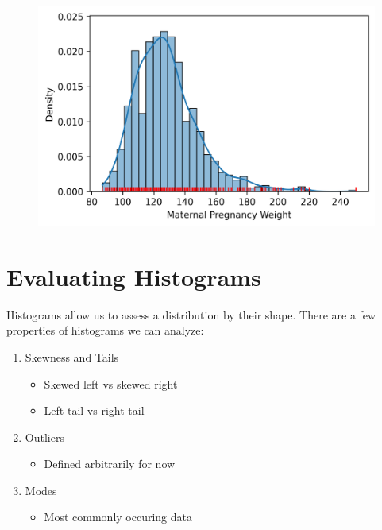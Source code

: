\documentclass[
  letterpaper,
  DIV=11,
  numbers=noendperiod]{scrreprt}
\providecommand{\tightlist}{%
  \setlength{\itemsep}{0pt}\setlength{\parskip}{0pt}}\usepackage{longtable,booktabs,array}
\begin{document}
\begin{figure}[H]

{\centering \includegraphics{visualization_1/visualization_1_files/figure-pdf/cell-10-output-1.png}

}

\end{figure}

\hypertarget{evaluating-histograms}{%
\section{Evaluating Histograms}\label{evaluating-histograms}}

Histograms allow us to assess a distribution by their shape. There are a
few properties of histograms we can analyze:

\begin{enumerate}
\def\labelenumi{\arabic{enumi}.}
\tightlist
\item
  Skewness and Tails

  \begin{itemize}
  \tightlist
  \item
    Skewed left vs skewed right
  \item
    Left tail vs right tail
  \end{itemize}
\item
  Outliers

  \begin{itemize}
  \tightlist
  \item
    Defined arbitrarily for now
  \end{itemize}
\item
  Modes

  \begin{itemize}
  \tightlist
  \item
    Most commonly occuring data
  \end{itemize}
\end{enumerate}
\end{document}
